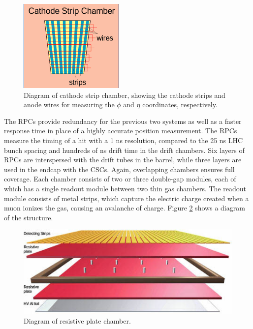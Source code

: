  \begin{figure}[htb]
  \begin{center}
    \includegraphics[]{Figures/muon-CSC-structure.png}
  \end{center}
  \caption[Diagram of cathode strip chamber]{Diagram of cathode strip chamber, showing the cathode strips and anode wires for measuring the $\phi$ and $\eta$ coordinates, respectively.}
  \label{fig:CSCstructure}
 \end{figure}

The RPCs provide redundancy for the previous 
two systems as well as a faster response time 
in place of a highly accurate position measurement.  
The RPCs measure the timing of a hit with a 
1 ns resolution, compared to the 25 ns LHC bunch spacing 
and hundreds of ns drift time in the drift chambers.  
Six layers of RPCs are interspersed with the 
drift tubes in the barrel, 
while three layers are used in the endcap 
with the CSCs.  
Again, overlapping chambers ensures full coverage.  
Each chamber consists of two or three double-gap 
modules, each of which has a single readout module 
between two thin gas chambers.  
The readout module consists of metal strips, 
which capture the electric charge created when 
a muon ionizes the gas, causing an avalanche of charge.  
Figure \ref{fig:RPClayers} shows a diagram of the structure.  

 \begin{figure}[htb]
  \begin{center}
    \includegraphics[width=360pt]{Figures/muon-RPClayers.jpg}
  \end{center}
  \caption[Diagram of resistive plate chamber]{Diagram of resistive plate chamber.}
  \label{fig:RPClayers}
 \end{figure}


